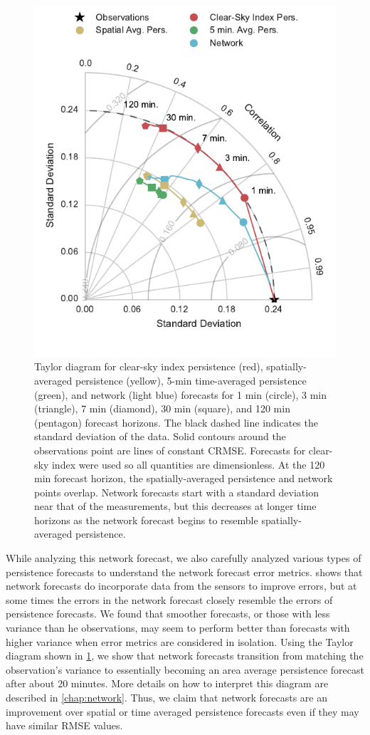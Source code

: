 \begin{figure}[htbp]
\centering
\includegraphics[width=.7\textwidth]{figs/taylor_diagram.pdf}
\caption[Taylor diagram for the network and various persistence
forecasts]{Taylor diagram for clear-sky index persistence (red),
  spatially-averaged persistence (yellow), 5-min time-averaged
  persistence (green), and network (light blue) forecasts for 1 min
  (circle), 3 min (triangle), 7 min (diamond), 30 min (square), and
  120 min (pentagon) forecast horizons. The black dashed line
  indicates the standard deviation of the data. Solid contours around
  the observations point are lines of constant CRMSE. Forecasts for
  clear-sky index were used so all quantities are dimensionless. At
  the 120 min forecast horizon, the spatially-averaged persistence and
  network points overlap. Network forecasts start with a standard
  deviation near that of the measurements, but this decreases at
  longer time horizons as the network forecast begins to resemble
  spatially-averaged persistence.
}
\label{fig:taylor}
\end{figure}

While analyzing this network forecast, we also carefully analyzed
various types of persistence forecasts to understand the network
forecast error metrics.
 shows that network forecasts do incorporate
data from the sensors to improve errors, but at some times the errors
in the network forecast closely resemble the errors of persistence forecasts.
We found that smoother forecasts, or those with less variance than he
observations, may seem to perform better than forecasts with higher
variance when error metrics are considered in isolation.
Using the Taylor diagram shown in \cref{fig:taylor}, we show that
network forecasts transition from matching the observation's variance
to essentially becoming an area average persistence forecast after
about 20 minutes.
More details on how to interpret this diagram are described in
\cref{chap:network}.
Thus, we claim that network forecasts are an improvement over spatial
or time averaged persistence forecasts even if they may have similar
RMSE values.

